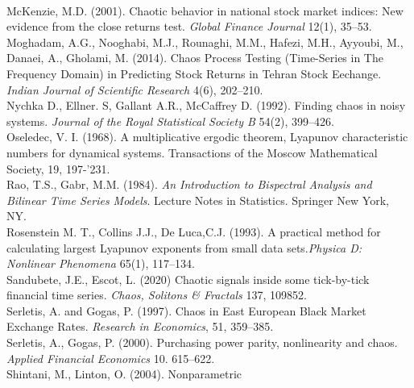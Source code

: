 \documentclass[12pt]{article}
\begin{document}
\newline{}\\
\noindent McKenzie, M.D. (2001). Chaotic behavior in national stock market indices: New evidence from the close returns test.
\emph{Global Finance Journal} 12(1), 35--53.
\newline{}\\
\noindent Moghadam, A.G., Nooghabi, M.J., Rounaghi, M.M., Hafezi, M.H., Ayyoubi, M., Danaei, A., Gholami, M. (2014).
Chaos Process Testing (Time-Series in The Frequency Domain) in Predicting Stock Returns in Tehran Stock Eechange.
\emph{Indian Journal of Scientific Research} 4(6), 202--210.
\newline{}\\
\noindent Nychka D., Ellner. S, Gallant A.R., McCaffrey D. (1992). Finding chaos in noisy systems. \emph{Journal of the Royal Statistical Society B} 54(2), 399--426.    
\newline{}\\
\noindent Oseledec, V. I. (1968). A multiplicative ergodic theorem, Lyapunov characteristic numbers for dynamical systems. Transactions of the Moscow Mathematical Society, 19, 197-'231.
\newline{}\\
\noindent Rao, T.S., Gabr, M.M. (1984). \emph{An Introduction to Bispectral Analysis and Bilinear Time Series Models}. Lecture Notes in Statistics.
Springer New York, NY.
\newline{}\\
\noindent Rosenstein M. T., Collins J.J., De Luca,C.J. (1993). A practical method for calculating largest Lyapunov exponents from small data sets.\emph{Physica D: Nonlinear Phenomena} 65(1), 117--134.
\newline{}\\
\noindent Sandubete, J.E., Escot, L. (2020) Chaotic signals inside some tick-by-tick financial time series. \emph{Chaos, Solitons \& Fractals} 137, 109852.
\newline{}\\
\noindent Serletis, A. and Gogas, P. (1997). Chaos in East European Black Market Exchange Rates. \emph{Research in Economics}, 51, 359--385.
\newline{}\\
\noindent Serletis, A., Gogas, P. (2000). Purchasing power parity, nonlinearity and chaos.
\emph{Applied Financial Economics} 10. 615--622.
\newline{}\\
\noindent Shintani, M., Linton, O. (2004). Nonparametric
\end{document}
